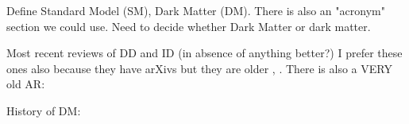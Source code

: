 Define Standard Model (SM), Dark Matter (DM). There is also an "acronym" section we could use. 
Need to decide whether Dark Matter or dark matter.

Most recent reviews of DD and ID (in absence of anything better?)
\cite{DMDD_NaturePhysics}
\cite{DMID_NaturePhysics}
I prefer these ones also because they have arXivs but they are older \cite{Gaskins:2016cha}, \cite{0954-3899-43-1-013001}. There is also a VERY old AR: \cite{doi:10.1146/annurev.nucl.54.070103.181244}

History of DM: ~\cite{Bertone:2016nfn}
